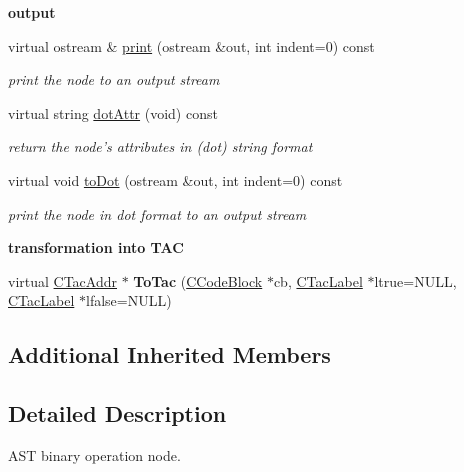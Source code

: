 \begin{Indent}{\bf output}\par
\begin{DoxyCompactItemize}
\item 
virtual ostream \& \hyperlink{classCAstBinaryOp_abd991aadb398dc947b479ad4437a1fd5}{print} (ostream \&out, int indent=0) const 
\begin{DoxyCompactList}\small\item\em print the node to an output stream \end{DoxyCompactList}\item 
virtual string \hyperlink{classCAstBinaryOp_a57b33ffe1c3ba6ba7689ebacb377caa0}{dot\-Attr} (void) const 
\begin{DoxyCompactList}\small\item\em return the node's attributes in (dot) string format \end{DoxyCompactList}\item 
virtual void \hyperlink{classCAstBinaryOp_a16ae6ed449554de787aae994813c9acc}{to\-Dot} (ostream \&out, int indent=0) const 
\begin{DoxyCompactList}\small\item\em print the node in dot format to an output stream \end{DoxyCompactList}\end{DoxyCompactItemize}
\end{Indent}
\begin{Indent}{\bf transformation into T\-A\-C}\par
\begin{DoxyCompactItemize}
\item 
\hypertarget{classCAstBinaryOp_a59d2f0e8970ef19817e2c857a96a30e5}{virtual \hyperlink{classCTacAddr}{C\-Tac\-Addr} $\ast$ {\bfseries To\-Tac} (\hyperlink{classCCodeBlock}{C\-Code\-Block} $\ast$cb, \hyperlink{classCTacLabel}{C\-Tac\-Label} $\ast$ltrue=N\-U\-L\-L, \hyperlink{classCTacLabel}{C\-Tac\-Label} $\ast$lfalse=N\-U\-L\-L)}\label{classCAstBinaryOp_a59d2f0e8970ef19817e2c857a96a30e5}

\end{DoxyCompactItemize}
\end{Indent}
\subsection*{Additional Inherited Members}


\subsection{Detailed Description}
A\-S\-T binary operation node. 

